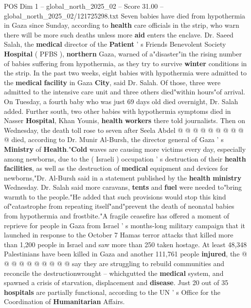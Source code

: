 \begin{textsample}{POS Dim 1 – global\_north\_2025\_02 – Score 31.00 – global\_north\_2025\_02/121725298.txt}  \label{ex:f1_pos_431}
Seven babies have died from hypothermia in Gaza since Sunday, according to \textbf{health} care officials in the strip, who warn there will be more such deaths unless more \textbf{aid} enters the enclave.
Dr.
Saeed Salah, the \textbf{medical} director of the \textbf{Patient} ' s Friends Benevolent Society \textbf{Hospital} ( PFBS ), \textbf{northern} Gaza, warned of a"disaster"in the rising number of babies suffering from hypothermia, as they try to survive \textbf{winter} conditions in the strip.
In the past two weeks, eight babies with hypothermia were admitted to the \textbf{medical} \textbf{facility} in Gaza \textbf{City}, said Dr.
Salah.
Of those, three were admitted to the intensive care unit and three others died"within hours"of arrival.
On Tuesday, a fourth baby who was just 69 days old died overnight, Dr.
Salah added.
Further south, two other babies with hypothermia symptoms died in Nasser \textbf{Hospital}, Khan Younis, \textbf{health} \textbf{workers} there told journalists.
Then on Wednesday, the death toll rose to seven after Seela Abdel @ @ @ @ @ @ @ @ @ @ died, according to Dr.
Munir Al-Bursh, the director general of Gaza ' s \textbf{Ministry} of \textbf{Health}."\textbf{Cold} waves are causing more victims every day, especially among newborns, due to the ( Israeli ) occupation ' s destruction of their \textbf{health} \textbf{facilities}, as well as the destruction of \textbf{medical} equipment and devices for newborns,"Dr.
Al-Bursh said in a statement published by the \textbf{health} \textbf{ministry} Wednesday.
Dr.
Salah said more caravans, \textbf{tents} and \textbf{fuel} were needed to"bring warmth to the people."He added that such provisions would stop this kind of"catastrophe from repeating itself"and"prevent the death of neonatal babies from hypothermia and frostbite."A fragile ceasefire has offered a moment of reprieve for people in Gaza from Israel ' s months-long military campaign that it launched in response to the October 7 Hamas terror attacks that killed more than 1,200 people in Israel and saw more than 250 taken hostage.
At least 48,348 Palestinians have been killed in Gaza and another 111,761 people \textbf{injured}, the @ @ @ @ @ @ @ @ @ @ say they are struggling to rebuild communities and reconcile the destructionwrought -- whichgutted the \textbf{medical} system, and spawned a crisis of starvation, displacement and \textbf{disease}.
Just 20 out of 35 \textbf{hospitals} are partially functional, according to the UN ' s Office for the Coordination of \textbf{Humanitarian} Affairs.

\end{textsample}

